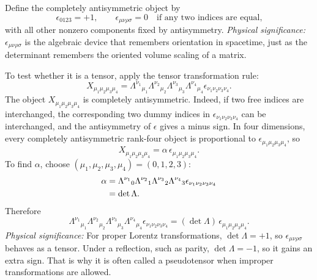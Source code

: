 Define the completely antisymmetric object by
\begin{equation}\label{eq:lec11-epsilon-def}
  \boxed{
  \epsilon_{0123}=+1,\qquad
  \epsilon_{\mu\nu\rho\sigma}=0
  \quad\text{if any two indices are equal,}
  }
\end{equation}
with all other nonzero components fixed by antisymmetry.
\textit{Physical significance:} $\epsilon_{\mu\nu\rho\sigma}$ is the algebraic
device that remembers orientation in spacetime, just as the determinant remembers
the oriented volume scaling of a matrix.

To test whether it is a tensor, apply the tensor transformation rule:
\begin{equation}\label{eq:lec11-epsilon-transform-question}
  X_{\mu_1\mu_2\mu_3\mu_4}
  =
  \Lambda^{\nu_1}{}_{\mu_1}
  \Lambda^{\nu_2}{}_{\mu_2}
  \Lambda^{\nu_3}{}_{\mu_3}
  \Lambda^{\nu_4}{}_{\mu_4}
  \epsilon_{\nu_1\nu_2\nu_3\nu_4}.
\end{equation}
The object $X_{\mu_1\mu_2\mu_3\mu_4}$ is completely antisymmetric.  Indeed, if
two free indices are interchanged, the corresponding two dummy indices in
$\epsilon_{\nu_1\nu_2\nu_3\nu_4}$ can be interchanged, and the antisymmetry of
$\epsilon$ gives a minus sign.  In four dimensions, every completely antisymmetric
rank-four object is proportional to $\epsilon_{\mu_1\mu_2\mu_3\mu_4}$, so
\begin{equation}\label{eq:lec11-epsilon-alpha}
  X_{\mu_1\mu_2\mu_3\mu_4}
  =
  \alpha\,
  \epsilon_{\mu_1\mu_2\mu_3\mu_4}.
\end{equation}
To find $\alpha$, choose $(\mu_1,\mu_2,\mu_3,\mu_4)=(0,1,2,3)$:
\begin{align}
  \alpha
  &=
  \Lambda^{\nu_1}{}_{0}
  \Lambda^{\nu_2}{}_{1}
  \Lambda^{\nu_3}{}_{2}
  \Lambda^{\nu_4}{}_{3}
  \epsilon_{\nu_1\nu_2\nu_3\nu_4}
  \notag\\
  &=
  \det \Lambda .
  \label{eq:lec11-alpha-det}
\end{align}
Therefore
\begin{equation}\label{eq:lec11-epsilon-transform}
  \boxed{
  \Lambda^{\nu_1}{}_{\mu_1}
  \Lambda^{\nu_2}{}_{\mu_2}
  \Lambda^{\nu_3}{}_{\mu_3}
  \Lambda^{\nu_4}{}_{\mu_4}
  \epsilon_{\nu_1\nu_2\nu_3\nu_4}
  =
  (\det\Lambda)\,
  \epsilon_{\mu_1\mu_2\mu_3\mu_4}.
  }
\end{equation}
\textit{Physical significance:} For proper Lorentz transformations, $\det\Lambda=+1$,
so $\epsilon_{\mu\nu\rho\sigma}$ behaves as a tensor.  Under a reflection, such as
parity, $\det\Lambda=-1$, so it gains an extra sign.  That is why it is often called
a pseudotensor when improper transformations are allowed.

